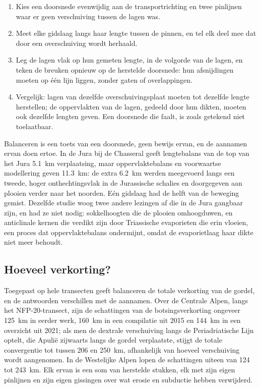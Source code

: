 \begin{method}\label{met:b2:alpine-orogen:restore}
\begin{enumerate}
\item Kies een doorsnede evenwijdig aan de transportrichting en twee pinlijnen waar er
geen verschuiving tussen de lagen was.
\item Meet elke gidslaag langs haar lengte tussen de pinnen, en tel elk deel mee dat
door een overschuiving wordt herhaald.
\item Leg de lagen vlak op hun gemeten lengte, in de volgorde van de lagen,
en teken de breuken opnieuw op de herstelde doorsnede: hun afsnijdingen moeten op één lijn liggen, zonder gaten
of overlappingen.
\item Vergelijk: lagen van dezelfde overschuivingsplaat moeten tot dezelfde lengte herstellen; de oppervlakten van
de lagen, gedeeld door hun dikten, moeten ook dezelfde lengten geven. Een doorsnede die
faalt, is zoals getekend niet toelaatbaar.
\end{enumerate}
\end{method}

Balanceren is een toets van een doorsnede, geen bewijs ervan, en de aannamen ervan doen ertoe. In de Jura
bij de Chasseral geeft lengtebalans van de top van het Jura \qty{5.1}{km}
verplaatsing, maar oppervlaktebalans en voorwaartse modellering geven \qty{11.3}{km}: de extra
\qty{6.2}{km} werden meegevoerd langs een tweede, hoger onthechtingsvlak in de Jurassische schalies en
doorgegeven aan plooien verder naar het noorden. Eén gidslaag had de helft van de beweging gemist. Dezelfde studie
woog twee andere lezingen af die in de Jura gangbaar zijn, en had ze niet nodig: sokkelhoogten die de plooien
omhoogduwen, en anticlinale kernen die verdikt zijn door Triassische evaporieten die erin vloeien, een
proces dat oppervlaktebalans ondermijnt, omdat de evaporietlaag haar
dikte niet meer behoudt.

\subsection*{Hoeveel verkorting?}

Toegepast op hele transecten geeft balanceren de totale verkorting van de gordel, en de antwoorden
verschillen met de aannamen. Over de Centrale Alpen, langs het NFP-20-transect, zijn de schattingen
van de botsingsverkorting ongeveer \qty{125}{km} in eerder werk, \qty{160}{km} in
een compilatie uit 2015 en \qty{144}{km} in een overzicht uit 2021; als men de dextrale verschuiving langs de Periadriatische Lijn optelt, die
Apulië zijwaarts langs de gordel verplaatste, stijgt de totale convergentie tot tussen 206 en
\qty{250}{km}, afhankelijk van hoeveel verschuiving wordt aangenomen. In de Westelijke Alpen lopen de schattingen
uiteen van 124 tot \qty{243}{km}. Elk ervan is een som van herstelde stukken, elk met
zijn eigen pinlijnen en zijn eigen gissingen over wat erosie en subductie hebben verwijderd.

